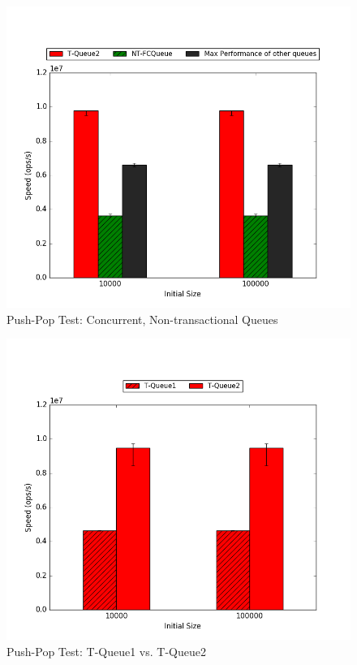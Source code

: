 \begin{figure}[H]
    \centering
    \includegraphics[width=\textwidth]{concurrent/Q:PushPop.png}
    \caption{Push-Pop Test: Concurrent, Non-transactional Queues}
    \label{fig:concurrentqs_pushpop}
\end{figure}

\begin{figure}[H]
    \centering
	\begin{minipage}{0.45\textwidth}
	\includegraphics[width=\textwidth]{fcqueues/stoQ:PushPop.png}
	\end{minipage}
	\begin{minipage}{0.45\textwidth}
		
	\end{minipage}
    \caption{Push-Pop Test: T-Queue1 vs. T-Queue2}
    \label{fig:stoqs_pushpop}
\end{figure}

